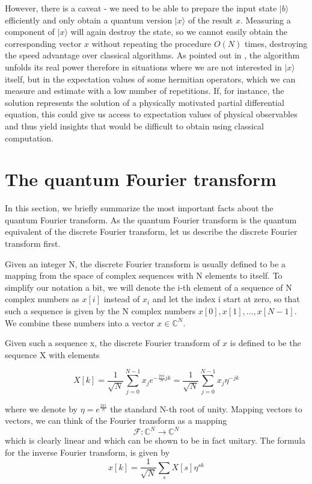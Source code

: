 \documentclass[a4paper, draft]{article}
\theoremstyle{own}
\theoremstyle{remark}
\newcommand{\C}{\mathbb{C}}
\begin{document}
However, there is a caveat - we need to be able to prepare the input state $|b \rangle$ efficiently and only obtain a quantum version $|x \rangle$ of the result $x$. Measuring a component of $|x \rangle$ will again destroy the state, so we cannot easily obtain the corresponding vector $x$ without repeating the procedure $O(N)$ times, destroying the speed advantage over classical algorithms. As pointed out in \cite{HHL2009}, the algorithm unfolds its real power therefore in situations where we are not interested in $|x \rangle$ itself, but in the expectation values of some hermitian operators, which we can measure and estimate with a low number of repetitions. If, for instance, the solution represents the solution of a physically motivated partial differential equation, this could give us access to expectation values of physical observables and thus yield insights that would be difficult to obtain using classical computation.

\appendix

\section{The quantum Fourier transform}

In this section, we briefly summarize the most important facts about the quantum Fourier transform. As the quantum Fourier transform is the quantum equivalent of the discrete Fourier transform, let us describe the discrete Fourier transform first.

Given an integer N, the discrete Fourier transform is usually defined to be a mapping from the space of complex sequences with N elements to itself. To simplify our notation a bit, we will denote the i-th element of a sequence of N complex numbers as $x[i]$ instead of $x_i$ and let the index i start at zero, so that such a sequence is given by the N complex numbers $x[0], x[1], \dots, x[N-1]$. We combine these numbers into a vector $x \in \C^N$. 

Given such a sequence x, the discrete Fourier transform of $x$ is defined to be the sequence X with elements

$$
X[k] = \frac{1}{\sqrt{N}} \sum_{j=0}^{N-1} x_j e^{-\frac{2\pi i}{N} jk} = \frac{1}{\sqrt{N}} \sum_{j=0}^{N-1} x_j \eta^{-jk}
$$

where we denote by $\eta = e^{\frac{2\pi i}{N}}$ the standard N-th root of unity. Mapping vectors to vectors, we can think of the Fourier transform as a mapping
$$
\mathcal{F} \colon \C^N \rightarrow \C^N
$$
which is clearly linear and which can be shown to be in fact unitary. The formula for the inverse Fourier transform, is given by
$$
x[k] = \frac{1}{\sqrt{N}} \sum_s X[s] \eta^{sk}
$$
\end{document}
